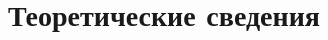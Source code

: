 \documentclass{article}
\begin{document}
\newpage



\section{Теоретические сведения}


\end{document}
